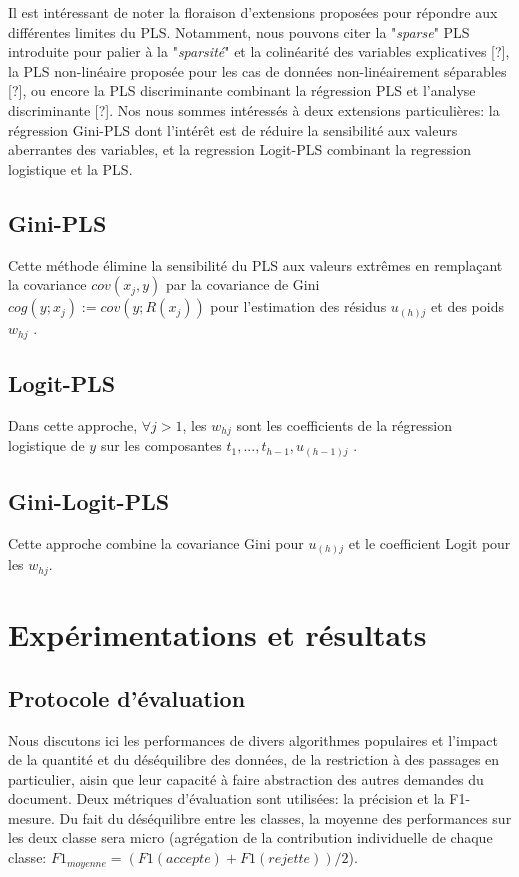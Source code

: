 Il est intéressant de noter la floraison d'extensions proposées pour répondre aux différentes limites du PLS. Notamment, nous pouvons citer la "\textit{sparse}" PLS introduite pour palier à la "\textit{sparsité}" et la colinéarité des variables explicatives [?], la PLS non-linéaire proposée pour les cas de données non-linéairement séparables [?], ou encore la PLS discriminante combinant la régression PLS et l'analyse discriminante [?]. Nos nous sommes intéressés à deux extensions particulières: la régression Gini-PLS \citep{mussard2018ginipls} dont l'intérêt est de réduire la sensibilité aux valeurs aberrantes des variables, et la regression Logit-PLS \citep{tenenhaus2005logitpls}  combinant la regression logistique et la PLS.
\subsection{Gini-PLS}
Cette méthode élimine la sensibilité du PLS aux valeurs extrêmes en remplaçant la covariance $cov(x_j, y)$ par la covariance de Gini $cog(y; x_j) := cov(y; R(x_j))$ pour l'estimation des résidus $u_{(h)j}$ et des poids $w_{hj}$ \citep{mussard2018ginipls}.


\subsection{Logit-PLS}
Dans cette approche, $\forall j > 1$, les $w_{hj} $ sont les coefficients de la régression logistique de $y$ sur les composantes $t_1, ..., t_{h-1}, u_{(h-1)j}$ \cite{tenenhaus2005logitpls}.

\subsection{Gini-Logit-PLS}
Cette approche combine la covariance Gini pour $u_{(h)j}$ et le coefficient Logit pour les $w_{hj}$.

\section{Expérimentations et résultats}
\label{sec:sensresultat:experimentations}
\subsection{Protocole d'évaluation}
Nous discutons ici les performances de divers algorithmes populaires et l'impact de la quantité et du déséquilibre des données, de la restriction à des passages en particulier, aisin que leur capacité à faire abstraction des autres demandes du document. Deux métriques d'évaluation sont utilisées: la précision et la F1-mesure. Du fait du déséquilibre entre les classes, la moyenne des performances sur les deux classe sera micro (agrégation de la contribution individuelle de chaque classe: $F1_{moyenne} = (F1({accepte}) + F1({rejette})) / 2$).

